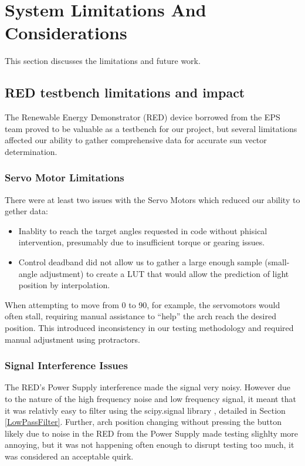 \section{System Limitations And Considerations}
This section discusses the limitations and future work.
\subsection{\acf{RED} testbench limitations and impact}
The Renewable Energy Demonstrator (RED) device borrowed from the EPS team \cite{RefWorks:shopov2022renewable} proved to be valuable as a testbench for our project, but several limitations affected our ability to gather comprehensive data for accurate sun vector determination.
\subsubsection{Servo Motor Limitations}
There were at least two issues with the Servo Motors which reduced our ability to gether data:
\begin{itemize}
    \item Inablity to reach the target angles requested in code without phisical intervention, presumably due to insufficient torque or gearing issues.
    \item Control deadband did not allow us to gather a large enough sample (small-angle adjustment) to create a \ac{LUT} that would allow the prediction of light position by interpolation.
\end{itemize}

When attempting to move from 0\textdegree{} to 90\textdegree{}, for example, the servomotors would often stall, requiring manual assistance to ``help'' the arch reach the desired position. This introduced inconsistency in our testing methodology and required manual adjustment using protractors.

\subsubsection{Signal Interference Issues}

The \ac{RED}'s Power Supply interference made the signal very noisy. However due to the nature of the high frequency noise and low frequency signal, it meant that it was relativly easy to filter using the scipy.signal library \cite{RefWorks:butter}, detailed in Section \ref{LowPassFilter}. Further, arch position changing without pressing the button likely due to noise in the \ac{RED} from the Power Supply made testing slighlty more annoying, but it was not happening often enough to disrupt testing too much, it was considered an acceptable quirk.

